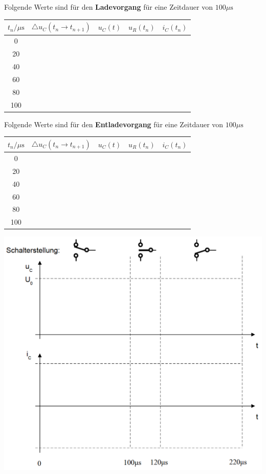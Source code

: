 Folgende Werte sind für den \textbf{Ladevorgang} für eine Zeitdauer von $100\mu\text{s}$
\begin{center} 
\begin{tabular}{|c|c|c|c|c|}\hline
$t_n/\mu\text{s}$&$\triangle u_C\left(t_n\rightarrow t_{n+1}\right)$&$u_C\left(t\right)$&$u_R\left(t_n \right)$&$i_C\left(t_n \right)$\\\hline
0&&&&\\
20&&&&\\
40&&&&\\
60&&&&\\
80&&&&\\
100&&&&\\\hline
\end{tabular}
\end{center}
Folgende Werte sind für den \textbf{Entladevorgang} für eine Zeitdauer von $100\mu\text{s}$
\begin{center} 
\begin{tabular}{|c|c|c|c|c|}\hline
$t_n/\mu\text{s}$&$\triangle u_C\left(t_n\rightarrow t_{n+1}\right)$&$u_C\left(t\right)$&$u_R\left(t_n \right)$&$i_C\left(t_n \right)$\\\hline
0&&&&\\
20&&&&\\
40&&&&\\
60&&&&\\
80&&&&\\
100&&&&\\\hline
\end{tabular}
\end{center}
\begin{center}
\includegraphics[scale=0.45]{../img/IV/IVg}
\end{center}
